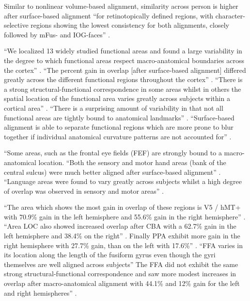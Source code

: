 Similar to nonlinear volume-based alignment, similarity across person is higher
after surface-based alignment ``for retinotopically defined regions, with
character-selective regions showing the lowest consistency for both alignments,
closely followed by mFus- and IOG-faces'' \citep{rosenke2021probabilistic}.
%

%
``We localized 13 widely studied functional areas and found a large variability
in the degree to which functional areas respect macro-anatomical boundaries
across the cortex'' \citep{frost2012measuring}.
%
``The percent gain in overlap [after surface-based alignment] differed greatly
across the different functional regions throughout the cortex''
\citep{frost2012measuring}.
%
``There is a strong structural-functional correspondence in some areas whilst in
others the spatial location of the functional area varies greatly across
subjects within a cortical area'' \citep{frost2012measuring}.
%
``There is a surprising amount of variability in that not all functional areas
are tightly bound to anatomical landmarks'' \citep{frost2012measuring}.
%
``Surface-based alignment is able to separate functional regions which are more
prone to blur together if individual anatomical curvature patterns are not
accounted for'' \citep{frost2012measuring}.

%
``Some areas, such as the frontal eye fields (FEF) are strongly bound to a
macro-anatomical location.
%
``Both the sensory and motor hand areas (bank of the central sulcus) were much
better aligned after surface-based alignment'' \citep{frost2012measuring}.
%
``Language areas were found to vary greatly across subjects whilst a high degree
of overlap was observed in sensory and motor areas'' \citep{frost2012measuring}.

%
``The area which shows the most gain in overlap of these regions is V5 / hMT+
with 70.9\% gain in the left hemisphere and 55.6\% gain in the right
hemisphere'' \citep{frost2012measuring}.
%
``Area LOC also showed increased overlap after CBA with a 62.7\% gain in the
left hemisphere and 38.4\% on the right'' \citep{frost2012measuring}.
%
Finally PPA exhibit more gain in the right hemisphere with 27.7\% gain, than on
the left with 17.6\%'' \citep{frost2012measuring}.
%
``FFA varies in its location along the length of the fusiform gyrus even though
the gyri themselves are well aligned across subjects''
%
The FFA did not exhibit the same strong structural-functional correspondence and
saw more modest increases in overlap after macro-anatomical alignment with
44.1\% and 12\% gain for the left and right hemispheres''
\citep{frost2012measuring}.


